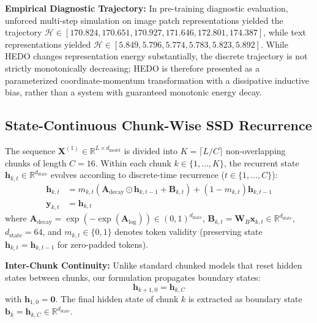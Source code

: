 \documentclass[journal]{IEEEtran}
\begin{document}
\textbf{Empirical Diagnostic Trajectory:} In pre-training diagnostic evaluation, unforced multi-step simulation on image patch representations yielded the trajectory $\mathcal{H} \in [170.824, 170.651, 170.927, 171.646, 172.801, 174.387]$, while text representations yielded $\mathcal{H} \in [5.849, 5.796, 5.774, 5.783, 5.823, 5.892]$. While HEDO changes representation energy substantially, the discrete trajectory is not strictly monotonically decreasing; HEDO is therefore presented as a parameterized coordinate-momentum transformation with a dissipative inductive bias, rather than a system with guaranteed monotonic energy decay.

\subsection{State-Continuous Chunk-Wise SSD Recurrence}
The sequence $\mathbf{X}^{(1)} \in \mathbb{R}^{L \times d_{\text{model}}}$ is divided into $K = \lceil L / C \rceil$ non-overlapping chunks of length $C=16$. Within each chunk $k \in \{1, \dots, K\}$, the recurrent state $\mathbf{h}_{k, t} \in \mathbb{R}^{d_{\text{state}}}$ evolves according to discrete-time recurrence ($t \in \{1, \dots, C\}$):
\begin{align}
\mathbf{h}_{k, t} &= m_{k, t} \left( \mathbf{A}_{\text{decay}} \odot \mathbf{h}_{k, t-1} + \mathbf{B}_{k, t} \right) + (1 - m_{k, t}) \mathbf{h}_{k, t-1} \\
\mathbf{y}_{k, t} &= \mathbf{h}_{k, t}
\end{align}
where $\mathbf{A}_{\text{decay}} = \exp(-\exp(\mathbf{A}_{\text{log}})) \in (0, 1)^{d_{\text{state}}}$, $\mathbf{B}_{k, t} = \mathbf{W}_B \mathbf{x}_{k, t} \in \mathbb{R}^{d_{\text{state}}}$, $d_{\text{state}}=64$, and $m_{k, t} \in \{0, 1\}$ denotes token validity (preserving state $\mathbf{h}_{k, t} = \mathbf{h}_{k, t-1}$ for zero-padded tokens).

\textbf{Inter-Chunk Continuity:} Unlike standard chunked models that reset hidden states between chunks, our formulation propagates boundary states:
\begin{equation}
\mathbf{h}_{k+1, 0} = \mathbf{h}_{k, C}
\end{equation}
with $\mathbf{h}_{1, 0} = \mathbf{0}$. The final hidden state of chunk $k$ is extracted as boundary state $\mathbf{b}_k = \mathbf{h}_{k, C} \in \mathbb{R}^{d_{\text{state}}}$.
\end{document}
